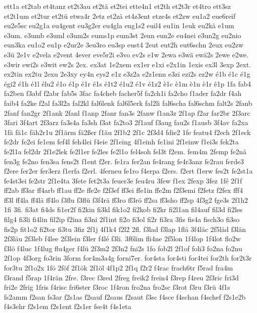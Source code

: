 {ett1a
et2tab
et4tanz
et2t3au
et2tä
et2tei
ette4n1
et2th
et2t3r
et4tro
ett3sz
et2t1um
et2tur
et2tü
etwa4r
2etz
et2zä
et4z3ent
etze4s
et2zw
eu1a2
eue6reif
eu2e5sc
eu2g1a
eu4gent
eu3g2er
eu4gla
eug1s2
euil4
eu1in
1euk
eu2kä
e1um
e3um.
e3umb
e3uml
e3um2s
eums1p
eum3st
2eun
eun2e
eu4nei
e3un2g
eu2nio
eun3ka
eu1o2
eu1p
e2ur2e
3eu3ro
eu3sp
eust4
2eut
eut2h
eut6schn
2eux
eu2zw
e3ü
2e1v
e2vela
e2vent
4ever
eve5r2i
e3vo
ev2s
e1w
2ewa
e3wä
ewä2s
2ewe
e2we.
e3wir
ewi2s
e3wit
ew2s
2ex.
ex3at
1e2xem
ex1er
e1xi
e2x1in
1exis
ex3l
3exp
2ext.
ex2tin
ex2tu
2exu
2e3xy
ey4n
eys2
e1z
e3z2a
e2z1enn
e3zi
ezi2s
ez2w
é1b
é1c
é1g
égi2
é1h
é1l
élu2
é1o
é1p
é1r
é1s
é1t2
é1u2
é1v
é1z2
è1c
è1m
è1n
è1r
ê1p
1fa
fab4
fa2ben
f3abf
f2abr
fab5s
3fac
fa4cheb
facher5f
fa2ch1i
fa2cho
f1ader
fa2dr
f4ah
faib4
fa2ke
f2al
fa3l2a
fal2kl
fal6lenk
fal6l5erk
fal2li
fal6scha
fal6schm
falt2s
2fanb
2fanf
fan2gr
2f1ank
2fanl
f1anp
2fanr
fan3s
2fanw
f1an3z
2f1ap
f2ar
far2br
2f3arc
3fari
3f4art
2f3arz
fa3s4a
fa3sh
f3at
fa2to3
2f1auf
f3aug
fau2s
f1ausb
3f4av
fa2xa
1fä
fä1c
fäh2r1u
2f1ärm
fä2ßer
f1äu
2f1b2
2f1c
2f3d4
fdie2
1fe
featu4
f2ech
2f1eck
fe2dr
fe2ei
fe1em
fef4l
feh4lei
f4eie
2f1eing
4f1einh
fe1ini
2f1einw
f1ei3s
fek2ta
fe2l1a
fel2dr
2f1e2lek
fe2l1er
fe2les
fe2l1o
fel4soh
fel3t
f2em.
fem4m
2femp
fe2nä
fen3g
fe2no
fen3sa
fens2t
f1ent
f2er.
fe1ra
fer2an
fe4rang
fe4r3anz
fe2rau
ferde3
f2ere
fer2er
fer3erz
f1erfa
f2erl.
4ferneu
fe1ro
f4erpa
f2ers.
f2ert
f1erw
fes2t
fe2st1a
fe4st3ei
fe2str
2f1e4ta
3fete
fet2t3a
feuer3e
feu4ru
3few
f1ex
2fexp
3fez
1fé
2f1f
ff2ab
ff3ar
ff4arb
ff1au
ff2e
ffe2e
f2f3ef
ff3ei
ffe1in
ffe2m
f2f3emi
f2fetz
f2fex
fff4
ff3l
ff4la
ff4lä
ff4lo
f3flu
f3flü
f3f4rä
ff3ro
ff3rö
ff2sa
ff3sho
ff2sp
4f3g2
fge3s
2f1h2
1fi
3fi.
fi3at
fi4ds
fi1er2f
fi2kin
fi3kl
fik1o2
fi2kob
fi2kr
fi2l1an
fil4auf
fil3d
fi2les
filg4
fi3li
fi4lin
fil2ip
f2ina
fi3ni
2f1int
fi2o
fi3ol
fi2r
fi3ra
3fis
fis4a
fisch3o
fi3so
fis2p
fit1o2
fi2tor
fi3tu
3fiz
2f1j
4f1k4
f2l2
2fl.
f3lad
f3lap
1flä
3f4läc
2f5läd
f3län
2f3läu
2f3leb
f4lee
2f3lein
f3ler
f4lé
f3li.
3f6lim
fli4ne
2f5lon
1f4lop
1f4lot
flo2w
f3lö
f4luc
1f4lug
flu4ger
f4lü
2f3m2
2f3n2
fni2s
1fo
fob2l
2f1of
foli3
fo2na
fo2nu
2f1op
4f3org
fo3rin
3form
for4m3a4g
forni7er.
for4sta
for4sti
for4tei
for2th
for2t3r
for3tu
2f1o2x
1fö
2föf
2f1ök
2f1öl
4f1p2
2f1q
f2r2
f4rac
frach6tr
f5rad
fra4m
f3rand
f5rap
1f4rän
2fre.
f3rec
f3red
2freg
freik2
frein4
f3rep
f4reu
2f3ric
fri3d
fri2e
2frig
1fris
f4risc
fri6ster
f3roc
1f4ron
fro2na
fro2sc
f3rot
f3ru
f3rü
4f1s
fs2amm
f2san
fs3ar
f2s1as
f2sauf
f2saus
f2saut
f3sc
f4sce
f4schan
f4schef
f2s1e2b
f4s3ehr
f2s1em
f2s1ent
f2s1er
fse4t
f4s1eta
}
